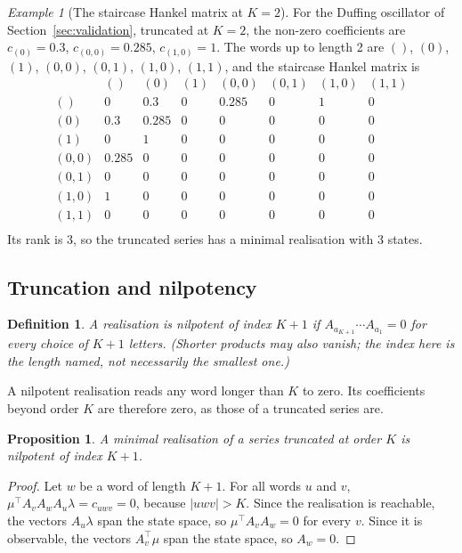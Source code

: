 \documentclass[11pt,a4paper]{article}
\newtheorem{proposition}{Proposition}
\newtheorem{definition}{Definition}
\theoremstyle{remark}
\newtheorem{example}{Example}
\begin{document}
\begin{example}[The staircase Hankel matrix at $K=2$]\label{ex:hankel}
For the Duffing oscillator of Section~\ref{sec:validation}, truncated at $K=2$, the non-zero coefficients are
$c_{(0)}=0.3$, $c_{(0,0)}=0.285$, $c_{(1,0)}=1$.
The words up to length 2 are $()$, $(0)$, $(1)$, $(0,0)$, $(0,1)$, $(1,0)$, $(1,1)$, and the staircase Hankel matrix is
\[
\begin{array}{c|ccccccc} & \scriptstyle () & \scriptstyle (0) & \scriptstyle (1) & \scriptstyle (0,0) & \scriptstyle (0,1) & \scriptstyle (1,0) & \scriptstyle (1,1)\\ \hline
\scriptstyle () & 0 & 0.3 & 0 & 0.285 & 0 & 1 & 0\\
\scriptstyle (0) & 0.3 & 0.285 & 0 & 0 & 0 & 0 & 0\\
\scriptstyle (1) & 0 & 1 & 0 & 0 & 0 & 0 & 0\\
\scriptstyle (0,0) & 0.285 & 0 & 0 & 0 & 0 & 0 & 0\\
\scriptstyle (0,1) & 0 & 0 & 0 & 0 & 0 & 0 & 0\\
\scriptstyle (1,0) & 1 & 0 & 0 & 0 & 0 & 0 & 0\\
\scriptstyle (1,1) & 0 & 0 & 0 & 0 & 0 & 0 & 0\\\end{array}
\]
Its rank is 3, so the truncated series has a minimal realisation with 3 states.
\end{example}

\subsection{Truncation and nilpotency}
\begin{definition}
A realisation is \emph{nilpotent of index $K+1$} if $A_{a_{K+1}}\cdots A_{a_1}=0$ for every choice of $K+1$ letters. (Shorter products may also vanish; the index here is the length named, not necessarily the smallest one.)
\end{definition}
A nilpotent realisation reads any word longer than $K$ to zero.
Its coefficients beyond order $K$ are therefore zero, as those of a truncated series are.

\begin{proposition}\label{prop:minimal}
A minimal realisation of a series truncated at order $K$ is nilpotent of index $K+1$.
\end{proposition}
\begin{proof}
Let $w$ be a word of length $K+1$.
For all words $u$ and $v$, $\mu^\top A_vA_wA_u\lambda=c_{uwv}=0$, because $|uwv|>K$.
Since the realisation is reachable, the vectors $A_u\lambda$ span the state space, so $\mu^\top A_vA_w=0$ for every $v$.
Since it is observable, the vectors $A_v^\top\mu$ span the state space, so $A_w=0$.
\end{proof}
\end{document}
